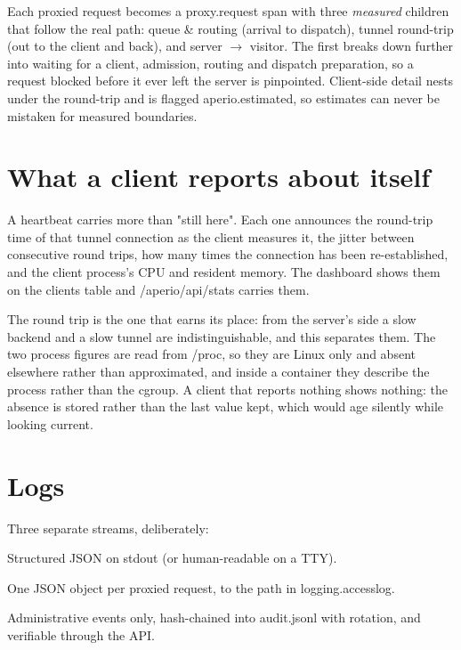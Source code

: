 \documentclass[11pt,a4paper,oneside]{book}
\newcommand{\aperiobreakableunderscore}{\textunderscore\allowbreak}
\newcommand{\aperiocodebreaks}{\XeTeXinterchartokenstate=1 }
\newcommand{\aperiocodebreaks}{}
\DeclareRobustCommand{\code}[1]{{\ttfamily\small\aperiocodebreaks
  \let\_\aperiobreakableunderscore#1}}
\begin{document}
Each proxied request becomes a \code{proxy.request} span with three
\emph{measured} children that follow the real path: \code{queue \&
routing} (arrival to dispatch), \code{tunnel round-trip} (out to the
client and back), and \code{server $\rightarrow$ visitor}. The first breaks
down further into waiting for a client, admission, routing and dispatch
preparation, so a request blocked before it ever left the server is
pinpointed. Client-side detail nests under the round-trip and is flagged
\code{aperio.estimated}, so estimates can never be mistaken for measured
boundaries.

\section{What a client reports about itself}

A heartbeat carries more than "still here". Each one announces the round-trip
time of that tunnel connection as the client measures it, the jitter between
consecutive round trips, how many times the connection has been
re-established, and the client process's CPU and resident memory. The
dashboard shows them on the clients table and \code{/aperio/api/stats}
carries them.

The round trip is the one that earns its place: from the server's side a slow
backend and a slow tunnel are indistinguishable, and this separates them. The
two process figures are read from \code{/proc}, so they are Linux only and
absent elsewhere rather than approximated, and inside a container they
describe the process rather than the cgroup. A client that reports nothing
shows nothing: the absence is stored rather than the last value kept, which
would age silently while looking current.

\section{Logs}

Three separate streams, deliberately:

\begin{description}[leftmargin=1.6em,style=nextline]
  \item[Application log] Structured JSON on stdout (or human-readable on
        a TTY).
  \item[Access log] One JSON object per proxied request, to the path in
        \code{logging.access\_log}.
  \item[Audit log] Administrative events only, hash-chained into
        \code{audit.jsonl} with rotation, and verifiable through the API.
\end{description}
\end{document}
